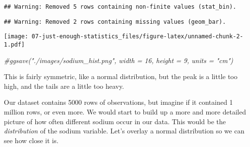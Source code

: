 \documentclass[
]{article}
\newenvironment{Shaded}{\begin{snugshade}}{\end{snugshade}}
\newcommand{\AttributeTok}[1]{\textcolor[rgb]{0.77,0.63,0.00}{#1}}
\newcommand{\CommentTok}[1]{\textcolor[rgb]{0.56,0.35,0.01}{\textit{#1}}}
\newcommand{\DecValTok}[1]{\textcolor[rgb]{0.00,0.00,0.81}{#1}}
\newcommand{\FunctionTok}[1]{\textcolor[rgb]{0.00,0.00,0.00}{#1}}
\newcommand{\NormalTok}[1]{#1}
\newcommand{\SpecialCharTok}[1]{\textcolor[rgb]{0.00,0.00,0.00}{#1}}
\newcommand{\StringTok}[1]{\textcolor[rgb]{0.31,0.60,0.02}{#1}}
\begin{document}
\begin{verbatim}
## Warning: Removed 5 rows containing non-finite values (stat_bin).
\end{verbatim}

\begin{verbatim}
## Warning: Removed 2 rows containing missing values (geom_bar).
\end{verbatim}

\texttt{[image: 07-just-enough-statistics\_files/figure-latex/unnamed-chunk-2-1.pdf]}

\begin{Shaded}
\begin{Highlighting}[]
\CommentTok{\#ggsave("./images/sodium\_hist.png", width = 16, height = 9, units = "cm")}
\end{Highlighting}
\end{Shaded}

This is fairly symmetric, like a normal distribution, but the peak is a
little too high, and the tails are a little too heavy.

Our dataset contains 5000 rows of observations, but imagine if it
contained 1 million rows, or even more. We would start to build up a
more and more detailed picture of how often different sodium occur in
our data. This would be the \emph{distribution} of the sodium variable.
Let's overlay a normal distribution so we can see how close it is.

\begin{Shaded}
\end{Shaded}
\end{document}
